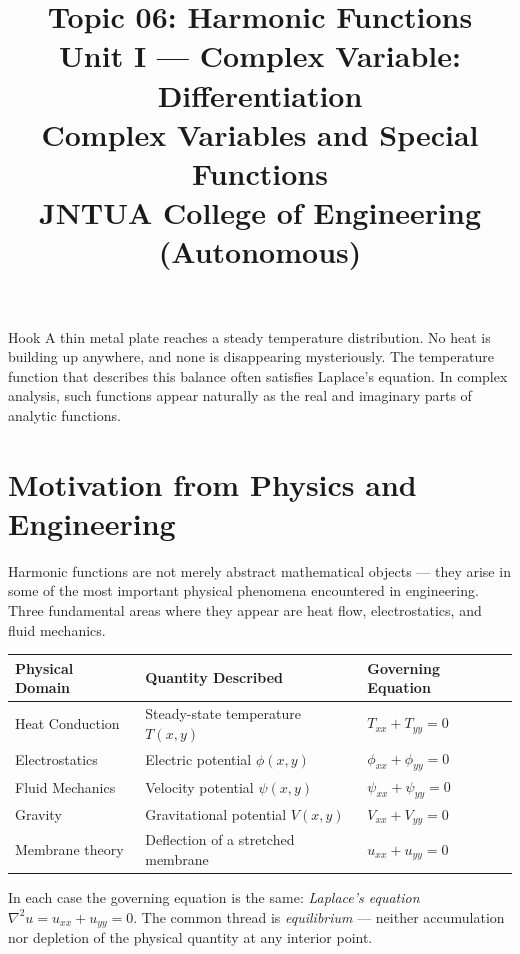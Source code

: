\documentclass[12pt,a4paper]{article}
\title{\textbf{Topic 06: Harmonic Functions}\\[6pt]
\large Unit I --- Complex Variable: Differentiation\\[4pt]
\normalsize Complex Variables and Special Functions\\
JNTUA College of Engineering (Autonomous)}
\date{}
\begin{document}
\maketitle
\tableofcontents
\newpage

\begin{curiositybox}{Hook}
A thin metal plate reaches a steady temperature distribution. No heat is building up anywhere,
and none is disappearing mysteriously. The temperature function that describes this balance often
satisfies Laplace's equation. In complex analysis, such functions appear naturally as the real
and imaginary parts of analytic functions.
\end{curiositybox}

\bigskip

\section{Motivation from Physics and Engineering}

Harmonic functions are not merely abstract mathematical objects --- they arise in some of the
most important physical phenomena encountered in engineering. Three fundamental areas where they
appear are heat flow, electrostatics, and fluid mechanics.

\begin{center}
\begin{tabular}{@{}lll@{}}
\toprule
\textbf{Physical Domain} & \textbf{Quantity Described} & \textbf{Governing Equation} \\
\midrule
Heat Conduction & Steady-state temperature $T(x,y)$ & $T_{xx}+T_{yy}=0$ \\
Electrostatics  & Electric potential $\phi(x,y)$     & $\phi_{xx}+\phi_{yy}=0$ \\
Fluid Mechanics & Velocity potential $\psi(x,y)$     & $\psi_{xx}+\psi_{yy}=0$ \\
Gravity         & Gravitational potential $V(x,y)$   & $V_{xx}+V_{yy}=0$ \\
Membrane theory & Deflection of a stretched membrane & $u_{xx}+u_{yy}=0$ \\
\bottomrule
\end{tabular}
\end{center}

In each case the governing equation is the same: \emph{Laplace's equation}
$\nabla^{2} u = u_{xx}+u_{yy}=0$. The common thread is \emph{equilibrium} --- neither
accumulation nor depletion of the physical quantity at any interior point.
\end{document}
